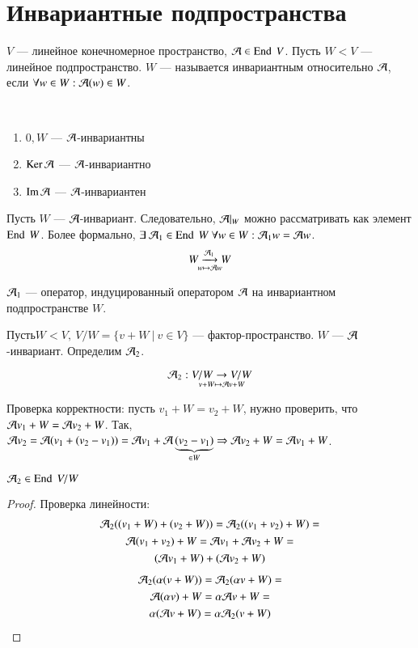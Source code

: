 \documentclass[main]{subfiles}
\begin{document}
\chapter{Инвариантные подпространства}

\begin{definition} 
    $V$ — линейное конечномерное пространство, $\mathcal{A}\in \operatorname{End} \ V$. Пусть $W  < V$ — линейное подпространство.
    $W$ — называется инвариантным относительно $\mathcal{A}$, если $\forall w\in W : \mathcal{A}(w) \in W$.
\end{definition}

\begin{propertylist}
    \
    \begin{enumerate}
        \item $0, W$ — $\mathcal{A}$-инвариантны
        \item $\operatorname{Ker} \mathcal{A}$ — $\mathcal{A}$-инвариантно
        \item $\operatorname{Im} \mathcal{A}$ — $\mathcal{A}$-инвариантен
    \end{enumerate}
\end{propertylist}



Пусть $W$ — $\mathcal{A}$-инвариант. Следовательно, $\mathcal{A}|_W$ можно рассматривать как элемент $\operatorname{End} \ W$.
Более формально, $\exists\  \mathcal{A}_1 \in \operatorname{End} \ W \ \forall w \in W : \mathcal{A}_1 w=\mathcal{A} w$.
\[\underset{w\mapsto \mathcal{A} w}{W\xrightarrow{\mathcal{A}_1} W}\]

$\mathcal{A}_1$  —  оператор, индуцированный оператором $\mathcal{A}$ на инвариантном подпространстве $W$.

$Пусть W < V,\ V/W = \{ v+W \ | \ v \in V\}$ — фактор-пространство.  $W$ — $\mathcal{A}$-инвариант.
Определим $\mathcal{A}_2$.

\[\mathcal{A}_2: \underset{v+W \mapsto \mathcal{A} v+W}{V/W \rightarrow V/W }\]

Проверка корректности: пусть $v_1+W = v_2+W$, нужно проверить, что $\mathcal{A} v_1+W=\mathcal{A} v_2 + W$. Так, $\mathcal{A} v_2= \mathcal{A}(v_1+(v_2-v_1))=\mathcal{A} v_1+ \mathcal{A}\underbrace{(v_2-v_1)}_{\in W} \Rightarrow
    \mathcal{A} v_2 + W= \mathcal{A} v_1+W$.

\begin{proposition} {}
    $\mathcal{A}_2 \in \operatorname{End} \ V/W$
\end{proposition}

\begin{proof}
    Проверка линейности:
    \begin{multline*}
        \mathcal{A}_2((v_1+W)+(v_2+W))= \mathcal{A}_2((v_1+v_2)+W)=\\
        \mathcal{A}(v_1+v_2)+W=  \mathcal{A} v_1+\mathcal{A} v_2+W=\\
        (\mathcal{A} v_1+W)+(\mathcal{A} v_2+W)
    \end{multline*}
    \begin{multline*}
        \mathcal{A}_2(\alpha(v+W))= \mathcal{A}_2(\alpha v+W)=\\
        \mathcal{A}(\alpha v)+W= \alpha \mathcal{A} v +W=\\
        \alpha(\mathcal{A} v +W) = \alpha \mathcal{A}_2(v+W)
    \end{multline*}
\end{proof}
\end{document}
